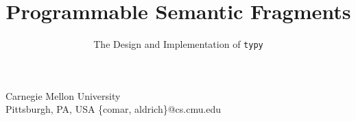 \documentclass[10pt]{sigplanconf}
\newif\ifext
\begin{document}

\title{Programmable Semantic Fragments \ifext(Extended Version)\titlenote{The original version of this paper, which omits the appendix, appears in the proceedings of GPCE 2016 \cite{gpce/Omar16}.}\fi}
\subtitle{The Design and Implementation of \texttt{typy}}


          {          Carnegie Mellon University \ifext \else \\ {Pittsburgh, PA, USA}\fi}
          {\{comar, aldrich\}@cs.cmu.edu\vspace{-6px}}   
\end{document}
